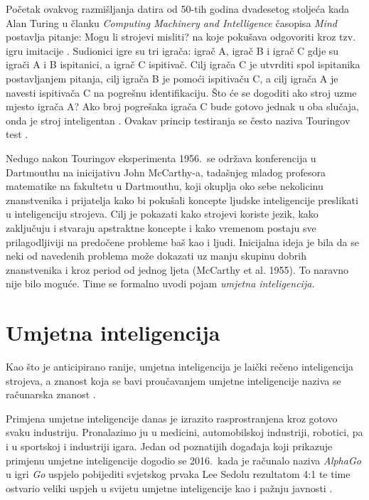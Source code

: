 \documentclass[times, utf8, zavrsni]{fer}
\begin{document}
Početak ovakvog razmišljanja datira od 50-tih godina dvadesetog stoljeća kada Alan Turing u članku \textit{Computing Machinery and Intelligence} časopisa \textit{Mind} postavlja pitanje: Mogu li strojevi misliti?  na koje pokušava odgovoriti kroz tzv. igru imitacije . Sudionici igre su tri igrača: igrač A, igrač B i igrač C gdje su igrači A i B ispitanici, a igrač C ispitivač. Cilj igrača C je utvrditi spol ispitanika postavljanjem pitanja, cilj igrača B je pomoći ispitivaču C, a cilj igrača A je navesti ispitivača C na pogrešnu identifikaciju. Što će se dogoditi ako stroj uzme mjesto igrača A? Ako broj pogrešaka igrača C bude gotovo jednak u oba slučaja, onda je stroj inteligentan \citep{turingAI}. Ovakav princip testiranja se često naziva Touringov test .

Nedugo nakon Touringov eksperimenta 1956.\ se održava konferencija u Dartmouthu \citep{wiki:DART} na inicijativu John McCarthy-a, tadašnjeg mladog profesora matematike na fakultetu u Dartmouthu, koji okuplja oko sebe nekolicinu znanstvenika i prijatelja kako bi pokušali koncepte ljudske inteligencije preslikati u inteligenciju strojeva. Cilj je pokazati kako strojevi koriste jezik, kako zaključuju i stvaraju apstraktne koncepte i kako vremenom postaju sve prilagodljiviji na predočene probleme baš kao i ljudi. Inicijalna ideja je bila da se neki od navedenih problema može dokazati uz manju skupinu dobrih znanstvenika i kroz period od jednog ljeta (McCarthy et al. 1955). To naravno nije bilo moguće. Time se formalno uvodi pojam \textit{umjetna inteligencija}.

\section{Umjetna inteligencija}
Kao što je anticipirano ranije, umjetna inteligencija  je laički rečeno inteligencija strojeva, a znanost koja se bavi proučavanjem umjetne inteligencije naziva se računarska znanost .

Primjena umjetne inteligencije danas je izrazito rasprostranjena kroz gotovo svaku industriju. Pronalazimo ju u medicini, automobilskoj industriji, robotici, pa i u sportskoj i industriji igara. Jedan od poznatijih događaja koji prikazuje primjenu umjetne inteligencije dogodio se 2016.\ kada je računalo naziva \textit{AlphaGo} u igri \textit{Go} uspjelo pobijediti svjetskog prvaka Lee Sedolu rezultatom 4:1 te time ostvario veliki uspjeh u svijetu umjetne inteligencije kao i pažnju javnosti \citep{moyerGO}.
\end{document}
